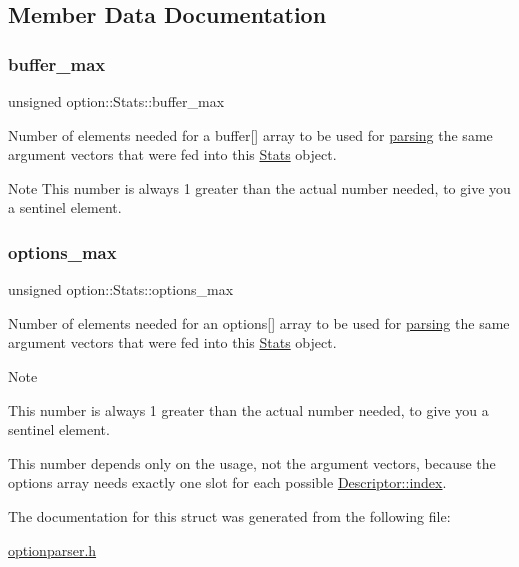 \subsection{Member Data Documentation}
\mbox{\label{structoption_1_1Stats_a2c9a7b4174f91ba8bcadaa9ad6f0db06}} 
\subsubsection{\texorpdfstring{buffer\+\_\+max}{buffer\_max}}
{\footnotesize\ttfamily unsigned option\+::\+Stats\+::buffer\+\_\+max}



Number of elements needed for a {\ttfamily buffer}\mbox{[}\mbox{]} array to be used for \hyperlink{classoption_1_1Parser_a6e0b5778d1cfbd6cd51240e74d01e138}{parsing} the same argument vectors that were fed into this \hyperlink{structoption_1_1Stats}{Stats} object. 

\begin{DoxyNote}{Note}
This number is always 1 greater than the actual number needed, to give you a sentinel element. 
\end{DoxyNote}
\mbox{\label{structoption_1_1Stats_a8121787feb1c7db84fca3ccb012b0473}} 
\subsubsection{\texorpdfstring{options\+\_\+max}{options\_max}}
{\footnotesize\ttfamily unsigned option\+::\+Stats\+::options\+\_\+max}



Number of elements needed for an {\ttfamily options}\mbox{[}\mbox{]} array to be used for \hyperlink{classoption_1_1Parser_a6e0b5778d1cfbd6cd51240e74d01e138}{parsing} the same argument vectors that were fed into this \hyperlink{structoption_1_1Stats}{Stats} object. 

\begin{DoxyNote}{Note}
\begin{DoxyItemize}
\item This number is always 1 greater than the actual number needed, to give you a sentinel element. \item This number depends only on the {\ttfamily usage}, not the argument vectors, because the {\ttfamily options} array needs exactly one slot for each possible \hyperlink{structoption_1_1Descriptor_a1fee8ac44f529c99ac2b1149b4c391b1}{Descriptor\+::index}. \end{DoxyItemize}

\end{DoxyNote}


The documentation for this struct was generated from the following file\+:\begin{DoxyCompactItemize}
\item 
\hyperlink{optionparser_8h}{optionparser.\+h}\end{DoxyCompactItemize}
